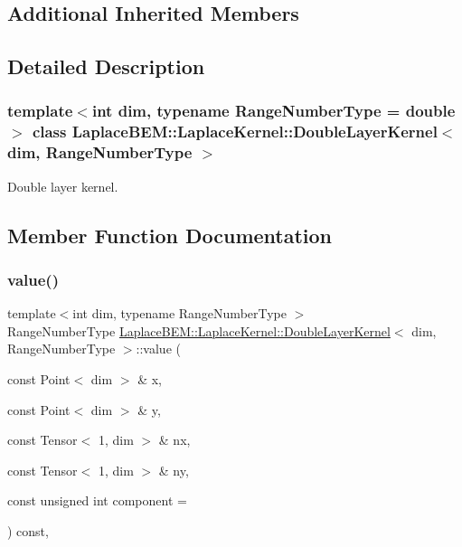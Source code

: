\subsection*{Additional Inherited Members}


\subsection{Detailed Description}
\subsubsection*{template$<$int dim, typename Range\+Number\+Type = double$>$\newline
class Laplace\+B\+E\+M\+::\+Laplace\+Kernel\+::\+Double\+Layer\+Kernel$<$ dim, Range\+Number\+Type $>$}

Double layer kernel. 

\subsection{Member Function Documentation}
\mbox{\label{classLaplaceBEM_1_1LaplaceKernel_1_1DoubleLayerKernel_a44836d10e150f631a40d16dc2092fdad}} 
\subsubsection{\texorpdfstring{value()}{value()}}
{\footnotesize\ttfamily template$<$int dim, typename Range\+Number\+Type $>$ \\
Range\+Number\+Type \hyperlink{classLaplaceBEM_1_1LaplaceKernel_1_1DoubleLayerKernel}{Laplace\+B\+E\+M\+::\+Laplace\+Kernel\+::\+Double\+Layer\+Kernel}$<$ dim, Range\+Number\+Type $>$\+::value (\begin{DoxyParamCaption}\item[{const Point$<$ dim $>$ \&}]{x,  }\item[{const Point$<$ dim $>$ \&}]{y,  }\item[{const Tensor$<$ 1, dim $>$ \&}]{nx,  }\item[{const Tensor$<$ 1, dim $>$ \&}]{ny,  }\item[{const unsigned int}]{component = {} }\end{DoxyParamCaption}) const\hspace{0.3cm}{\ttfamily [override]}, {\ttfamily [virtual]}}

